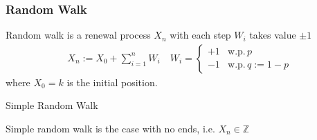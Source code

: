 \subsubsection{Random Walk}
\hypertarget{RandomWalk}{}

Random walk is a renewal process $ X_n $ with each step $ W_i $ takes value $ \pm 1 $
\begin{align}
    X_n := X_0 +\sum_{i=1}^nW_i\quad W_i=\begin{cases}
        +1&\mathrm{w.p.}\, p\\
        -1&\mathrm{w.p.}\, q:=1-p  
    \end{cases}
\end{align}
where $ X_0=k $ is the initial position.

\begin{point}
    Simple Random Walk
\end{point}

Simple random walk is the case with no ends, i.e. $ X_n\in \mathbb{Z} $



